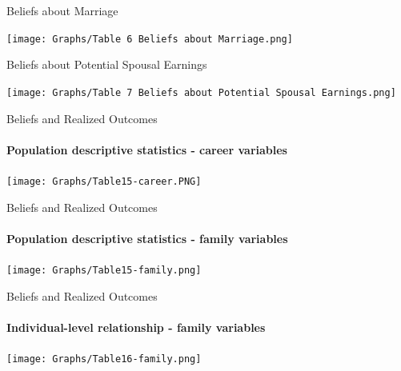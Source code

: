 \documentclass[12pt]{beamer}
\begin{document}
\begin{frame}{Beliefs about Marriage}
    \begin{center}
    \texttt{[image: Graphs/Table 6 Beliefs about Marriage.png]}
    \end{center}
\end{frame}

\begin{frame}{Beliefs about Potential Spousal Earnings}
    \begin{center}
    \texttt{[image: Graphs/Table 7 Beliefs about Potential Spousal Earnings.png]}
    \end{center}
\end{frame}

\begin{frame}{Beliefs and Realized Outcomes}
    \begin{center}
    \framesubtitle{Population descriptive statistics - career variables}
    \texttt{[image: Graphs/Table15-career.PNG]}
    \end{center}
\end{frame}

\begin{frame}{Beliefs and Realized Outcomes}
    \begin{center}
    \framesubtitle{Population descriptive statistics - family variables}
    \texttt{[image: Graphs/Table15-family.png]}
    \end{center}
\end{frame}

\begin{frame}{Beliefs and Realized Outcomes}
    \begin{center}
    \framesubtitle{Individual-level relationship - family variables}
    \texttt{[image: Graphs/Table16-family.png]}
    \end{center}
\end{frame}
\end{document}

